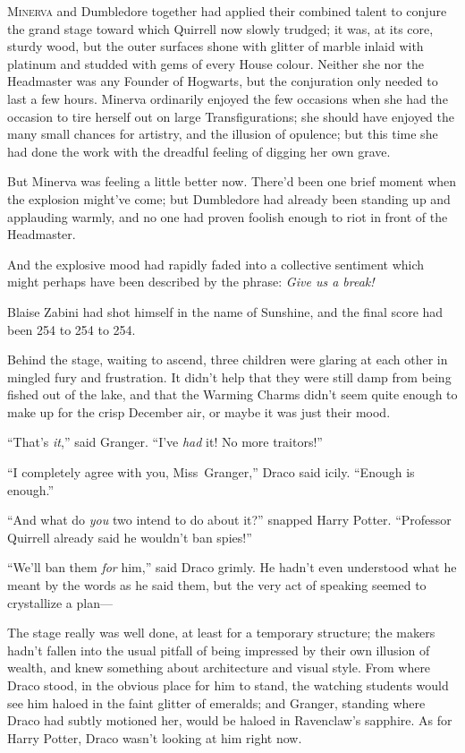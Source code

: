 
\lettrine{M}{inerva} and
Dumbledore together had applied their combined talent to conjure the grand
stage toward which Quirrell now slowly trudged; it was, at its core, sturdy
wood, but the outer surfaces shone with glitter of marble inlaid with platinum
and studded with gems of every House colour. Neither she nor the Headmaster was
any Founder of Hogwarts, but the conjuration only needed to last a few hours.
Minerva ordinarily enjoyed the few occasions when she had the occasion to tire
herself out on large Transfigurations; she should have enjoyed the many small
chances for artistry, and the illusion of opulence; but this time she had done
the work with the dreadful feeling of digging her own grave.

But Minerva was feeling a little better now. There’d been one brief moment when
the explosion might’ve come; but Dumbledore had already been standing up and
applauding warmly, and no one had proven foolish enough to riot in front of the
Headmaster.

And the explosive mood had rapidly faded into a collective sentiment which
might perhaps have been described by the phrase: \emph{Give us a break!}

Blaise Zabini had shot himself in the name of Sunshine, and the final score had
been 254 to 254 to 254.

\later

Behind the stage, waiting to ascend, three children were glaring at each other
in mingled fury and frustration. It didn’t help that they were still damp from
being fished out of the lake, and that the Warming Charms didn’t seem quite
enough to make up for the crisp December air, or maybe it was just their mood.

“That’s \emph{it},” said Granger. “I’ve \emph{had} it! No more traitors!”

“I completely agree with you, Miss~Granger,” Draco said icily. “Enough is
enough.”

“And what do \emph{you} two intend to do about it?” snapped Harry Potter.
“Professor Quirrell already said he wouldn’t ban spies!”

“We’ll ban them \emph{for} him,” said Draco grimly. He hadn’t even understood
what he meant by the words as he said them, but the very act of speaking seemed
to crystallize a plan—

\later

The stage really was well done, at least for a temporary structure; the makers
hadn’t fallen into the usual pitfall of being impressed by their own illusion
of wealth, and knew something about architecture and visual style. From where
Draco stood, in the obvious place for him to stand, the watching students would
see him haloed in the faint glitter of emeralds; and Granger, standing where
Draco had subtly motioned her, would be haloed in Ravenclaw’s sapphire. As for
Harry Potter, Draco wasn’t looking at him right now.

